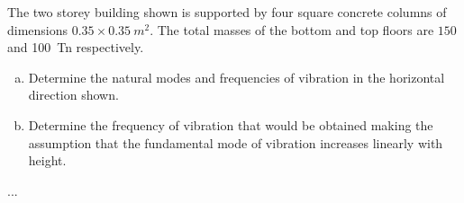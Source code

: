 
\begin{Exercise}[label={two_storey}]
The two storey building shown is supported by four square concrete columns of dimensions $0.35 \times \SI{0.35}{m^2}$. The total masses of the bottom and top floors are $150$ and \SI{100}{Tn} respectively.
\begin{enumerate}[(a)]
    \item Determine the natural modes and frequencies of vibration in the horizontal direction shown.
    \item Determine the frequency of vibration that would be obtained making the assumption that the fundamental mode of vibration increases linearly with height.
\end{enumerate}

\begin{center}
\end{center}

\shortAnswer ...
\end{Exercise}



\begin{Answer}[ref={two_storey}]
\end{Answer}
